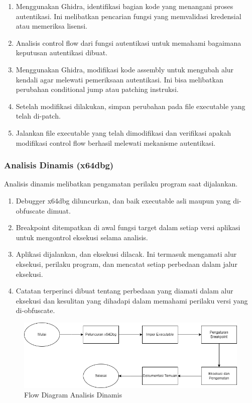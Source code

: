 \begin{enumerate}
	\item {} Menggunakan Ghidra, identifikasi bagian kode yang menangani proses autentikasi. Ini melibatkan pencarian fungsi yang memvalidasi kredensial atau memeriksa lisensi.
	\item {} Analisis control flow dari fungsi autentikasi untuk memahami bagaimana keputusan autentikasi dibuat.
	\item {} Menggunakan Ghidra, modifikasi kode assembly untuk mengubah alur kendali agar melewati pemeriksaan autentikasi. Ini bisa melibatkan perubahan conditional jump atau patching instruksi.
	\item {} Setelah modifikasi dilakukan, simpan perubahan pada file executable yang telah di-patch.
	\item {} Jalankan file executable yang telah dimodifikasi dan verifikasi apakah modifikasi control flow berhasil melewati mekanisme autentikasi.
\end{enumerate}

\subsubsection{Analisis Dinamis (x64dbg)}
Analisis dinamis melibatkan pengamatan perilaku program saat dijalankan.
\begin{enumerate}
	\item {} Debugger x64dbg diluncurkan, dan baik executable asli maupun yang di-obfuscate dimuat.
	\item {} Breakpoint ditempatkan di awal fungsi target dalam setiap versi aplikasi untuk mengontrol eksekusi selama analisis.
	\item {} Aplikasi dijalankan, dan eksekusi dilacak. Ini termasuk mengamati alur eksekusi, perilaku program, dan mencatat setiap perbedaan dalam jalur eksekusi.
	\item {} Catatan terperinci dibuat tentang perbedaan yang diamati dalam alur eksekusi dan kesulitan yang dihadapi dalam memahami perilaku versi yang di-obfuscate.
\end{enumerate}

\begin{figure}
	\centering
	\includegraphics[width=1\textwidth]
	{assets/pics/Dynamic.png}
	\caption{Flow Diagram Analisis Dinamis}
\end{figure}

